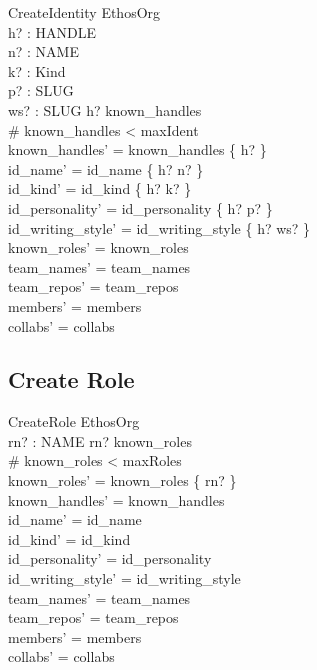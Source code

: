 \documentclass[a4paper,10pt,fleqn]{article}
\begin{document}
\begin{schema}{CreateIdentity}
  \Delta EthosOrg \\
  h? : HANDLE \\
  n? : NAME \\
  k? : Kind \\
  p? : SLUG \\
  ws? : SLUG
\where
  h? \notin known\_handles \\
  \# known\_handles < maxIdent \\
  known\_handles' = known\_handles \cup \{ h? \} \\
  id\_name' = id\_name \cup \{ h? \mapsto n? \} \\
  id\_kind' = id\_kind \cup \{ h? \mapsto k? \} \\
  id\_personality' = id\_personality \cup \{ h? \mapsto p? \} \\
  id\_writing\_style' = id\_writing\_style \cup \{ h? \mapsto ws? \} \\
  known\_roles' = known\_roles \\
  team\_names' = team\_names \\
  team\_repos' = team\_repos \\
  members' = members \\
  collabs' = collabs
\end{schema}

\subsection{Create Role}

\begin{schema}{CreateRole}
  \Delta EthosOrg \\
  rn? : NAME
\where
  rn? \notin known\_roles \\
  \# known\_roles < maxRoles \\
  known\_roles' = known\_roles \cup \{ rn? \} \\
  known\_handles' = known\_handles \\
  id\_name' = id\_name \\
  id\_kind' = id\_kind \\
  id\_personality' = id\_personality \\
  id\_writing\_style' = id\_writing\_style \\
  team\_names' = team\_names \\
  team\_repos' = team\_repos \\
  members' = members \\
  collabs' = collabs
\end{schema}
\end{document}
